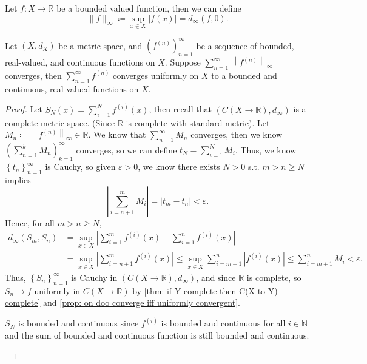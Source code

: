 \begin{definition}
   Let \(f:X \to \mathbb{R} \) be a bounded valued function, then we can define 
   \[
    \lVert f \rVert_\infty \coloneqq  \sup _{x \in X} \vert f(x) \vert = d_\infty \left( f, 0 \right). 
   \]  
\end{definition}

\begin{theorem} \label{thm: Weierstrass M-test (bounded and conti)}
    Let \((X, d_X)\) be a metric space, and \(\left( f^{(n)} \right)_{n=1}^{\infty}  \) be a sequence of bounded, real-valued, and continuous functions on \(X\). Suppose \(\sum_{n=1}^{\infty} \left\lVert f^{(n)} \right\rVert_{\infty }   \) converges, then \(\sum_{n=1}^{\infty} f^{(n)} \) converges uniformly on \(X\) to a bounded and continuous, real-valued functions on \(X\).        
\end{theorem}
\begin{proof}
    Let \(S_N(x) = \sum_{i=1}^N f^{(i)}(x) \), then recall that \(\left( C(X \to \mathbb{R} ), d_\infty  \right) \) is a complete metric space. (Since \(\mathbb{R} \) is complete with standard metric). Let \(M_n \coloneqq \left\lVert f^{(n)} \right\rVert _\infty \in \mathbb{R}  \). We know that \(\sum_{n=1}^{\infty} M_n \) converges, then we know \(\left( \sum_{n=1}^{k} M_n \right)_{k=1}^{\infty} \) converges, so we can define \(t_N = \sum_{i=1}^N M_i \). Thus, we know \(\left\{ t_n \right\}_{n=1}^{\infty}  \) is Cauchy, so given \(\varepsilon > 0\), we know there exists \(N > 0\) s.t. \(m > n \ge N\) implies 
    \[
        \left\vert \sum_{i=n+1}^m M_i  \right\vert  = \left\vert t_m - t_n \right\vert < \varepsilon. 
    \] 
    Hence, for all \(m > n \ge N\), 
    \begin{align*}
        d_\infty \left( S_m, S_n \right) &= \sup _{x \in X} \left\vert \sum_{i=1}^m f^{(i)}(x) - \sum_{i=1}^n f^{(i)}(x)   \right\vert \\
        &= \sup _{x \in X} \left\vert \sum_{i=n+1}^m f^{(i)}(x) \right\vert \le \sup _{x \in X} \sum_{i=m+1}^n \left\vert f^{(i)}(x) \right\vert \le \sum_{i=m+1}^n M_i < \varepsilon.    
    \end{align*}    
    Thus, \(\left\{ S_n \right\}_{n=1}^{\infty}  \) is Cauchy in \(\left( C(X \to \mathbb{R} ), d_\infty  \right) \), and since \(\mathbb{R} \) is complete, so \(S_n \to f\) uniformly in \(C(X \to \mathbb{R} )\) by \autoref{thm: if Y complete then C(X to Y) complete} and \autoref{prop: on doo converge iff uniformly convergent}.    
    
    \begin{note}
        \(S_N\) is bounded and continuous since \(f^{(i)}\) is bounded and continuous for all \(i \in \mathbb{N} \) and the sum of bounded and continuous function is still bounded and continuous.  
    \end{note}
\end{proof}

